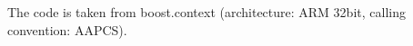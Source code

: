 \label{appendixa}

The code is taken from boost.context\cite{bcontext} (architecture: ARM 32bit,
calling convention: AAPCS).

